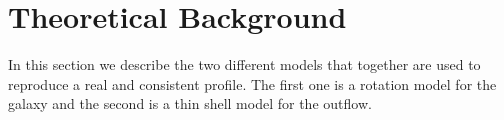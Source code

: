 \documentclass{latex/emulateapj}
\begin{document}





\section{Theoretical Background}
\label{sec:theo}
In this section we describe the two different models that together are used to reproduce a real and consistent \lya profile. The first one is a rotation model for the galaxy and the second is a thin shell model for the outflow. \\
\end{document}
